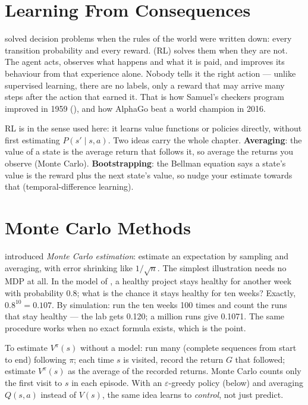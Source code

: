 \section{Learning From Consequences}

 solved decision problems when the rules of the world were written down:
every transition probability and every reward.  (RL)
solves them when they are not. The agent acts, observes what happens and what it is
paid, and improves its behaviour from that experience alone. Nobody tells it the right
action --- unlike supervised learning, there are no labels, only a reward that may
arrive many steps after the action that earned it. That is how Samuel's checkers
program improved in 1959 (), and how AlphaGo beat a world champion
in 2016.

RL is  in the sense used here: it learns value functions or policies
directly, without first estimating $P(s' \mid s, a)$. Two ideas carry the whole
chapter. \textbf{Averaging}: the value of a state is the average return that follows
it, so average the returns you observe (Monte Carlo). \textbf{Bootstrapping}: the
Bellman equation says a state's value is the reward plus the next state's value, so
nudge your estimate towards that (temporal-difference learning).

\section{Monte Carlo Methods}

 introduced \emph{Monte Carlo estimation}: estimate an expectation by
sampling and averaging, with error shrinking like $1/\sqrt{n}$. The simplest
illustration needs no MDP at all. In the model of , a healthy project
stays healthy for another week with probability 0.8; what is the chance it stays
healthy for ten weeks? Exactly, $0.8^{10} = 0.107$. By simulation: run the ten weeks
100 times and count the runs that stay healthy --- the lab gets 0.120; a million runs
give 0.1071. The same procedure works when no exact formula
exists, which is the point.

\begin{definitionbox}
To estimate $V^{\pi}(s)$ without a model: run many  (complete
sequences from start to end) following $\pi$; each time $s$ is visited, record the
return $G$ that followed; estimate $V^{\pi}(s)$ as the average of the recorded returns.
 Monte Carlo counts only the first visit to $s$ in each episode.
With an $\varepsilon$-greedy policy (below) and averaging $Q(s, a)$ instead of $V(s)$,
the same idea learns to \emph{control}, not just predict.
\end{definitionbox}

